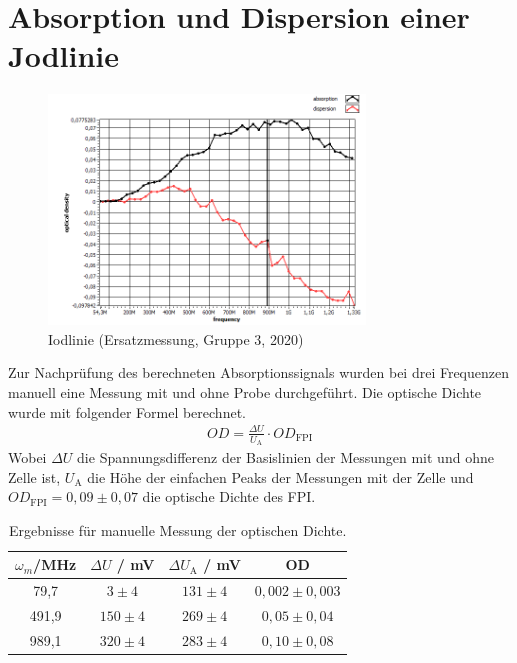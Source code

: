 
\newpage
\section{Absorption und Dispersion einer Jodlinie}


\begin{figure}[h]
    \centering
    \includegraphics[width=0.75\textwidth]{Bilder/Jodlinie/Gruppe32020Iododgraph1 Kopie.png}
    \caption[Iodlinie]{Iodlinie (Ersatzmessung, Gruppe 3, 2020)}
    \label{fig:IodlinieG32020}
\end{figure}


Zur Nachprüfung des berechneten Absorptionssignals wurden bei drei Frequenzen manuell eine Messung mit und ohne Probe durchgeführt. Die optische Dichte wurde mit folgender Formel berechnet.
\begin{align}
    OD = \frac{\Delta U}{U_\mathrm{A}} \cdot OD_\mathrm{FPI}
\end{align}
Wobei $\Delta U$ die Spannungsdifferenz der Basislinien der Messungen mit und ohne Zelle ist, $U_\mathrm{A}$ die Höhe der einfachen Peaks der Messungen mit der Zelle und $OD_\mathrm{FPI} = 0,09 \pm 0,07$ die optische Dichte des FPI.
\begin{table}[h]
    \centering
    \begin{tabular}{c|cc|c}
        $\omega_m$/MHz & $\Delta U$ / mV & $\Delta U_\mathrm{A}$ / mV & OD \\ \hline
        79,7 & $3 \pm 4$ & $131 \pm 4$ & $0,002 \pm 0,003$  \\
        491,9 & $150 \pm 4$ & $269 \pm 4$ & $0,05 \pm 0,04$ \\
        989,1 & $320 \pm 4$ & $283 \pm 4$ & $0,10 \pm 0,08$ \\
    \end{tabular}
    \caption{Ergebnisse für manuelle Messung der optischen Dichte.}
    \label{tab:ODIod}
\end{table}

